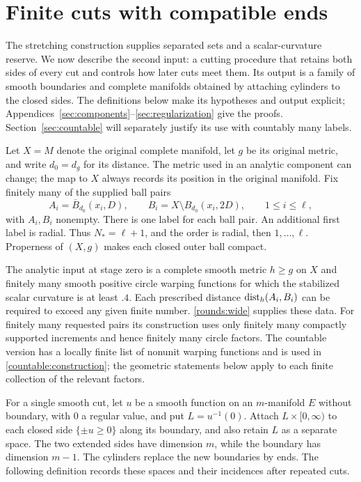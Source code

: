 \section{Finite cuts with compatible ends}\label{sec:finite-cuts}

The stretching construction supplies separated sets and a scalar-curvature
reserve. We now describe the second input: a cutting procedure that retains
both sides of every cut and controls how later cuts meet them. Its output is
a family of smooth boundaries and complete manifolds obtained by attaching
cylinders to the closed sides. The definitions below make its hypotheses
and output explicit; Appendices~\ref{sec:components}--\ref{sec:regularization}
give the proofs. Section~\ref{sec:countable} will separately justify its use
with countably many labels.

Let $X=M$ denote the original complete manifold, let $g$ be its original
metric, and write $d_0=d_g$ for its distance.  The metric used in an analytic
component can change; the map to $X$ always records its position in the
original manifold.  Fix finitely many of the supplied ball pairs
\[
 A_i=\overline B_{d_0}(x_i,D),\qquad
 B_i=X\setminus B_{d_0}(x_i,2D),\qquad 1\le i\le\ell,
\]
with $A_i,B_i$ nonempty. There is one label for each ball pair. An additional first label is radial.
Thus $N_*=\ell+1$, and the order is
radial, then $1,\ldots,\ell$.  Properness of $(X,g)$ makes each closed
outer ball compact.

The analytic input at stage zero is a complete smooth metric $h\ge g$ on $X$
and finitely many smooth positive circle warping functions for which the stabilized
scalar curvature is at least $.4$.  Each prescribed distance
$\operatorname{dist}_h(A_i,B_i)$ can be required to exceed any given finite number.
\cref{rounds:wide} supplies these data.  For finitely many requested
pairs its construction uses only finitely many compactly supported
increments and hence finitely many circle factors.  The countable
version has a locally finite list of nonunit warping functions and is used in
\cref{countable:construction}; the geometric statements below apply to
each finite collection of the relevant factors.

For a single smooth cut, let $u$ be a smooth function on an
$m$-manifold $E$ without boundary, with $0$ a regular value, and put
$L=u^{-1}(0)$.
Attach $L\times[0,\infty)$ to each closed side $\{\pm u\ge0\}$
along its boundary, and also retain $L$ as a separate space.
The two extended sides have dimension $m$, while the boundary has dimension
$m-1$. The cylinders replace the new boundaries by ends.
The following definition records these spaces and their incidences
after repeated cuts.

